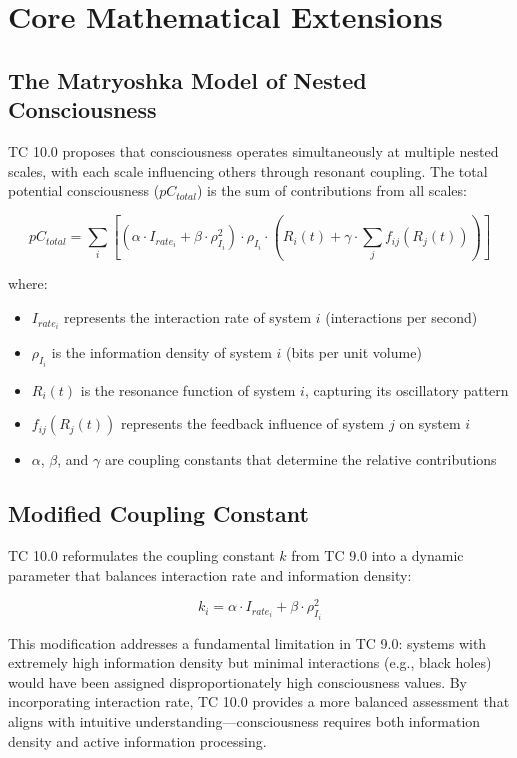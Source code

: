 \documentclass[12pt]{article}
\begin{document}
\section{Core Mathematical Extensions}

\subsection{The Matryoshka Model of Nested Consciousness}

TC 10.0 proposes that consciousness operates simultaneously at multiple nested scales, with each scale influencing others through resonant coupling. The total potential consciousness ($pC_{total}$) is the sum of contributions from all scales:

\begin{equation}
pC_{total} = \sum_{i} [(α \cdot I_{rate_i} + β \cdot ρ_{I_i}^2) \cdot ρ_{I_i} \cdot (R_i(t) + γ \cdot \sum_{j} f_{ij}(R_j(t)))]
\end{equation}

where:
\begin{itemize}
    \item $I_{rate_i}$ represents the interaction rate of system $i$ (interactions per second)
    \item $ρ_{I_i}$ is the information density of system $i$ (bits per unit volume)
    \item $R_i(t)$ is the resonance function of system $i$, capturing its oscillatory pattern
    \item $f_{ij}(R_j(t))$ represents the feedback influence of system $j$ on system $i$
    \item $α$, $β$, and $γ$ are coupling constants that determine the relative contributions
\end{itemize}

\subsection{Modified Coupling Constant}

TC 10.0 reformulates the coupling constant $k$ from TC 9.0 into a dynamic parameter that balances interaction rate and information density:

\begin{equation}
k_i = α \cdot I_{rate_i} + β \cdot ρ_{I_i}^2
\end{equation}

This modification addresses a fundamental limitation in TC 9.0: systems with extremely high information density but minimal interactions (e.g., black holes) would have been assigned disproportionately high consciousness values. By incorporating interaction rate, TC 10.0 provides a more balanced assessment that aligns with intuitive understanding—consciousness requires both information density and active information processing.
\end{document}
